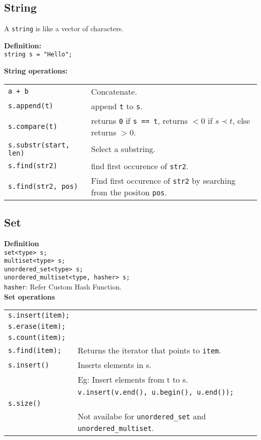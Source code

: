 \vfill \null
\columnbreak

\subsection{String}

A \texttt{string} is like a vector of characters.

\textbf{Definition:}\\
\texttt{string s = "Hello";}

\textbf{String operations:}\\
\begin{tabularx}{\linewidth}{lX}
\texttt{a + b} & Concatenate.\\
\texttt{s.append(t)} & append \texttt{t} to \texttt{s}.\\
\texttt{s.compare(t)} & returns \texttt{0} if \texttt{s == t}, returns $< 0$ if $s \prec t$, else returns $> 0$.\\
\texttt{s.substr(start, len)} & Select a substring. \\
\texttt{s.find(str2)} & find first occurence of \texttt{str2}. \\
\texttt{s.find(str2, pos)} & Find first occurence of \texttt{str2} by searching from the positon \texttt{pos}.
\end{tabularx}

\subsection{Set}
\textbf{Definition}\\
\texttt{set<type> s;}\\
\texttt{multiset<type> s;}\\
\texttt{unordered\_set<type> s;}\\
\texttt{unordered\_multiset<type, hasher> s;}\\
\texttt{hasher}: Refer Custom Hash Function.\\


\textbf{Set operations}\\
\begin{tabularx}{\linewidth}{lX}
\texttt{s.insert(item);} & \\
\texttt{s.erase(item);} & \\
\texttt{s.count(item);} & \\
\texttt{s.find(item);} & Returns the iterator that points to \texttt{item}.\\
\texttt{s.insert()} & Inserts elements in s.\\
& Eg: Insert elements from t to s.\\
& \texttt{v.insert(v.end(), u.begin(), u.end());}\\
\texttt{s.size()} & \\
& Not availabe for \texttt{unordered\_set}  and \texttt{unordered\_multiset}.\\
\end{tabularx}

